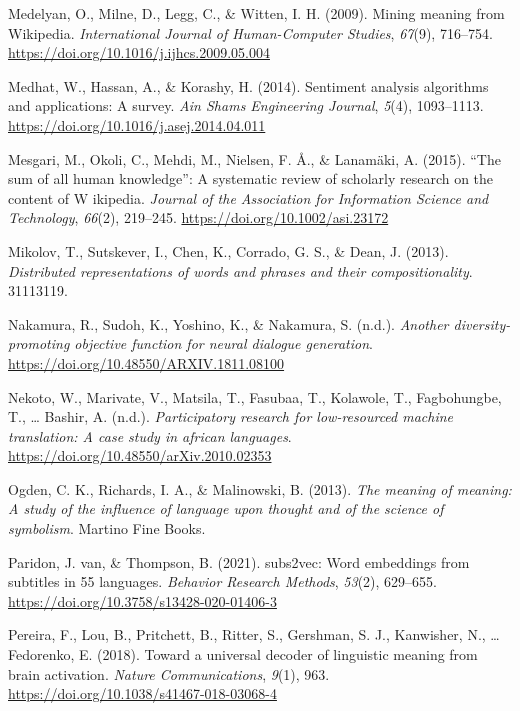 \documentclass[
  english,
  man,floatsintext]{apa6}
\newlength{\cslhangindent}
\newenvironment{CSLReferences}[2] %
 {\begin{list}{}{%
  \setlength{\itemindent}{0pt}
  \setlength{\leftmargin}{0pt}
  \setlength{\parsep}{0pt}
  \ifodd #1
   \setlength{\leftmargin}{\cslhangindent}
   \setlength{\itemindent}{-1\cslhangindent}
  \fi
  \setlength{\itemsep}{#2\baselineskip}}}
 {\end{list}}
\begin{document}
\begin{CSLReferences}{1}{0}
Medelyan, O., Milne, D., Legg, C., \& Witten, I. H. (2009). Mining meaning from Wikipedia. \emph{International Journal of Human-Computer Studies}, \emph{67}(9), 716--754. \url{https://doi.org/10.1016/j.ijhcs.2009.05.004}

Medhat, W., Hassan, A., \& Korashy, H. (2014). Sentiment analysis algorithms and applications: A survey. \emph{Ain Shams Engineering Journal}, \emph{5}(4), 1093--1113. \url{https://doi.org/10.1016/j.asej.2014.04.011}

Mesgari, M., Okoli, C., Mehdi, M., Nielsen, F. Å., \& Lanamäki, A. (2015). {``}The sum of all human knowledge{''}: A systematic review of scholarly research on the content of W ikipedia. \emph{Journal of the Association for Information Science and Technology}, \emph{66}(2), 219--245. \url{https://doi.org/10.1002/asi.23172}

Mikolov, T., Sutskever, I., Chen, K., Corrado, G. S., \& Dean, J. (2013). \emph{Distributed representations of words and phrases and their compositionality}. 31113119.

Nakamura, R., Sudoh, K., Yoshino, K., \& Nakamura, S. (n.d.). \emph{Another diversity-promoting objective function for neural dialogue generation}. \url{https://doi.org/10.48550/ARXIV.1811.08100}

Nekoto, W., Marivate, V., Matsila, T., Fasubaa, T., Kolawole, T., Fagbohungbe, T., \ldots{} Bashir, A. (n.d.). \emph{Participatory research for low-resourced machine translation: A case study in african languages}. \url{https://doi.org/10.48550/arXiv.2010.02353}

Ogden, C. K., Richards, I. A., \& Malinowski, B. (2013). \emph{The meaning of meaning: A study of the influence of language upon thought and of the science of symbolism}. Martino Fine Books.

Paridon, J. van, \& Thompson, B. (2021). subs2vec: Word embeddings from subtitles in 55 languages. \emph{Behavior Research Methods}, \emph{53}(2), 629--655. \url{https://doi.org/10.3758/s13428-020-01406-3}

Pereira, F., Lou, B., Pritchett, B., Ritter, S., Gershman, S. J., Kanwisher, N., \ldots{} Fedorenko, E. (2018). Toward a universal decoder of linguistic meaning from brain activation. \emph{Nature Communications}, \emph{9}(1), 963. \url{https://doi.org/10.1038/s41467-018-03068-4}


\end{CSLReferences}
\end{document}

